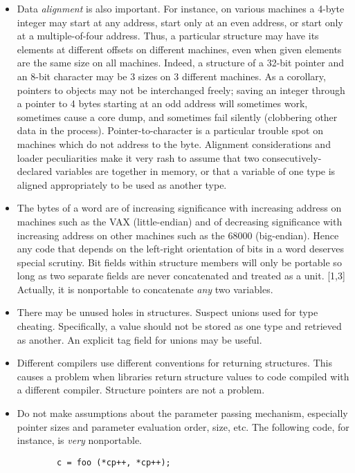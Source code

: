 \begin{itemize}
\item Data {\em alignment} is also important. For instance, on various
machines a 4-byte integer may start at any address, start only at an even
address, or start only at a multiple-of-four address. Thus, a particular
structure may have its elements at different offsets on different machines,
even when given elements are the same size on all machines. Indeed, a
structure of a 32-bit pointer and an 8-bit character may be 3 sizes on 3
different machines. As a corollary, pointers to objects may not be
interchanged freely; saving an integer through a pointer to 4 bytes
starting at an odd address will sometimes work, sometimes cause a core
dump, and sometimes fail silently (clobbering other data in the process).
Pointer-to-character is a particular trouble spot on machines which do
not address to the byte. Alignment considerations and loader peculiarities
make it very rash to assume that two consecutively-declared variables are
together in memory, or that a variable of one type is aligned appropriately
to be used as another type.

\item The bytes of a word are of increasing significance with increasing address
on machines  such as the VAX (little-endian) and of decreasing significance
with increasing address on  other machines such as the 68000 (big-endian).
Hence any code that depends on the  left-right orientation of bits in a word
deserves special scrutiny. Bit fields within structure  members will only be
portable so long as two separate fields are never concatenated and  treated as
a unit. [1,3] Actually, it is nonportable to concatenate {\em any} two
variables. 

\item There may be unused holes in structures. Suspect unions used for type
cheating.  Specifically, a value should not be stored as one type and retrieved
as another. An explicit tag field for unions may be useful. 

\item Different compilers use different conventions for returning structures.
This causes a  problem when libraries return structure values to code compiled
with a different compiler.  Structure pointers are not a problem. 

\item Do not make assumptions about the parameter passing mechanism, especially
pointer sizes and parameter evaluation order, size, etc. The following code,
for instance, is {\em very} nonportable.
\begin{verbatim}
        c = foo (*cp++, *cp++);


\end{verbatim}
\end{itemize}

